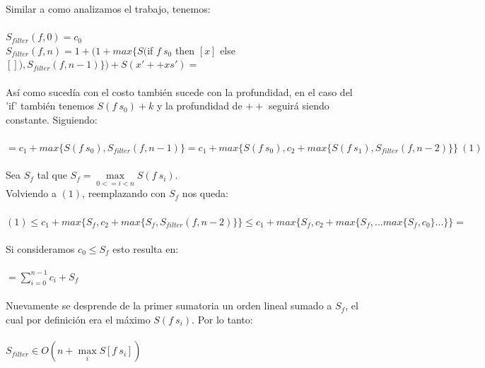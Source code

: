 \documentclass[12pt]{article}
\begin{document}
\begin{itemize}
Similar a como analizamos el trabajo, tenemos: \\
\\
    $S_{filter}(f, 0) = c_0$ \\
    $S_{filter}(f, n) = 1 + ( 1 + max\{ S($if $f\ s_0$ then $[x]$ else $[]), S_{filter}(f, n-1)\} ) + S(x'++xs') = $ \\
\\
    Así como sucedía con el costo también sucede con la profundidad, en el caso del 'if' también tenemos $S(f\ s_0) + k$ y la profundidad de $++$ seguirá siendo constante. Siguiendo:\\
\\
    $ = c_1 + max\{ S(f\ s_0), S_{filter}(f, n-1) \} = c_1 + max\{ S(f\ s_0), c_2 + max\{S(f\ s_1), S_{filter}(f, n-2) \} \} \ (1) $ \\
\\
    Sea $S_f$ tal que $S_f = \max\limits_{0<=i<n} S(f\ s_i)$. \\
    Volviendo a $(1)$, reemplazando con $S_f$ nos queda:\\
\\
    $(1) \leq 
    c_1 + max\{ S_f, c_2 + max\{S_f, S_{filter}(f, n-2) \} \} \leq 
    c_1 + max\{ S_f, c_2 + max\{S_f, ... max\{ S_f, c_0 \} ... \} \} = $\\
\\
    Si consideramos $c_0 \leq S_f$ esto resulta en:\\
\\
    $ = \sum\limits_{i=0}^{n-1} c_i + S_f $\\
\\
    Nuevamente se desprende de la primer sumatoria un orden lineal sumado a $S_f$, el cual por definición era el máximo $S(f\ s_i)$. Por lo tanto: \\
\\
    $S_{filter} \in O(n + \max\limits_{i} S[f\ s_i] )$\\


\end{itemize}
\end{document}
